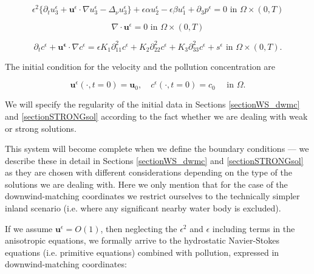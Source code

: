 \documentclass[12pt]{report}
\numberwithin{theorem}{chapter}
\numberwithin{corollary}{chapter}
\numberwithin{lemma}{chapter}
\numberwithin{remark}{chapter}
\numberwithin{definition}{chapter}
\numberwithin{prop}{chapter}
\begin{document}
\begin{equation} \label{ANSC3_coordinates_DWMC_intro}
  \epsilon^2 \{  \partial_t u_3^\epsilon + \mathbf{u}^\epsilon \cdot \nabla u_3^\epsilon -\Delta_\nu u_3^{\epsilon} \} + \epsilon \alpha u^\epsilon_2 - \epsilon \beta u_1^\epsilon + \partial_3 p^\epsilon = 0 \text{ in } \Omega \times (0,T)
\end{equation}

\begin{equation} \label{ANSC4_coordinates_DWMC_intro}
  \nabla \cdot \mathbf{u}^\epsilon= 0 \text{ in } \Omega \times (0,T)
\end{equation}

\begin{equation} \label{ANSC5_coordinates_DWMC_intro}
   \partial_t c^\epsilon + \mathbf{u^\epsilon} \cdot \nabla c^\epsilon = \epsilon K_1 \partial_{11} ^ 2 c^\epsilon + K_2 \partial_{22} ^ 2 c^\epsilon + K_3 \partial_{33} ^ 2 c^\epsilon + s^\epsilon \text{ in } \Omega \times (0,T).
\end{equation}

The initial condition for the velocity and the pollution concentration are
    
\begin{equation} \label{ANSC_init_coordinates_DWMC_intro}
  \mathbf{u}^\epsilon (\cdot, t = 0) = \mathbf{u}_0, \quad c^\epsilon (\cdot, t=0) = c_0  \quad \text{ in } \Omega.
\end{equation}

We will specify the regularity of the initial data in Sections \ref{sectionWS_dwmc} and \ref{sectionSTRONGsol} according to the fact whether we are dealing with weak or strong solutions.

This system will become complete when we define the boundary conditions --- we describe these in detail in Sections \ref{sectionWS_dwmc} and \ref{sectionSTRONGsol} as they are chosen with different considerations depending on the type of the solutions we are dealing with. Here we only mention that for the case of the downwind-matching coordinates we restrict ourselves to the technically simpler inland scenario (i.e. where any significant nearby water body is excluded).

If we assume $\mathbf{u}^\epsilon = O(1)$, then neglecting the $\epsilon^2$ and $\epsilon$ including terms in the anisotropic equations, we formally arrive to the hydrostatic Navier-Stokes equations (i.e. primitive equations) combined with pollution, expressed in downwind-matching coordinates:
\end{document}
